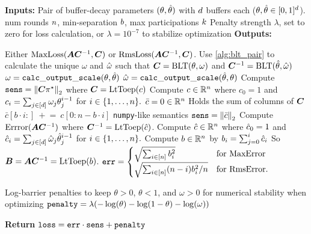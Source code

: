 \begin{algorithm}[htbp]
\caption{Differentiable Loss for BLTs} \label{alg:blt_loss}
\begin{algorithmic}%
\STATE \textbf{Inputs:} 
\STATE \myind Pair of buffer-decay parameters $(\theta, \hat{\theta})$ with $d$ buffers each ($\theta, \hat{\theta} \in [0, 1]^d$).
\STATE \myind num rounds $n$, min-separation $b$, max participations $k$
\STATE \myind Penalty strength $\lambda$, set to zero for loss calculation, or $\lambda = 10^{-7}$ to stabilize optimization
\STATE \textbf{Outputs:}

\STATE \myind Either $\operatorname{MaxLoss}({\bm{A}} {\bm{C}}^{-1}, {\bm{C}})$ or $\operatorname{RmsLoss}({\bm{A}} {\bm{C}}^{-1}, {\bm{C}})$.
\STATE
\STATEComment Use \cref{alg:blt_pair} to calculate the unique $\omega$ and $\hat{\omega}$ such that ${\bm{C}} = \text{BLT}(\theta, \omega)$ and ${\bm{C}}^{-1} = \text{BLT}(\hat{\theta}, \hat{\omega})$
\STATE $\omega = \mathtt{calc\_output\_scale}(\theta, \hat{\theta})$
\STATE $\hat{\omega} = \mathtt{calc\_output\_scale}(\hat{\theta}, \theta)$
\STATE
\STATEComment Compute $\mathtt{sens} = \left\|{{\bm{C}} \pi^\star}\right\|_2$ where ${\bm{C}} = \text{LtToep}(c)$ 
\STATE Compute $c \in \mathbb{R}^n$ where $c_0 = 1$ and $
c_i = \sum_{j \in [d]} \omega_j \theta_j^{i-1}$ for $i \in \{1, \dots, n\}.$
\STATE $\bar{c} = 0 \in \mathbb{R}^{n}$  \Comment Holds the sum of columns of ${\bm{C}}$
  \STATE $\bar{c}{[b\cdot i:]}\  +\!\!=\  c{[0 : n - b\cdot i]}$  \Comment \texttt{numpy}-like semantics
\ENDFOR
\STATE $\mathtt{sens} = \left\|{\bar{c}}\right\|_2$ 
\STATE
\STATEComment Compute $\text{Errror}({\bm{A}} {\bm{C}}^{-1})$ where ${\bm{C}}^{-1} = \text{LtToep}(\hat{c})$.
\STATE Compute $\hat{c} \in \mathbb{R}^n$ where $\hat{c}_0 = 1$ and $
\hat{c}_i = \sum_{j \in [d]} \hat{\omega}_j \hat{\theta}_j^{i-1}$ for $i \in \{1, \dots, n\}.$
\STATE Compute $b \in \mathbb{R}^n$ by $b_i = \sum_{j=0}^{i} \hat{c}_i$  \Comment So ${\bm{B}} = {\bm{A}}{\bm{C}}^{-1} = \text{LtToep}(b)$.
\STATE $\mathtt{err} = \begin{cases}
\sqrt{\sum_{i \in [n]} b_i^2} & \text{for MaxError} \\
\sqrt{ \sum_{i \in [n]} (n - i) b_i^2 / n} & \text{for RmsError}.
\end{cases}$

\STATE
\STATEComment Log-barrier penalties to keep $\theta > 0$, $\theta < 1$, and $\omega > 0$ for numerical stability when optimizing
\STATE $\mathtt{penalty} = \lambda (-\log(\theta) -\log(1 - \theta) -\log(\omega))$

\STATE 
\STATE \textbf{Return} $\mathtt{loss} = \mathtt{err} \cdot \mathtt{sens} + \mathtt{penalty}$
\end{algorithmic}
\end{algorithm}

